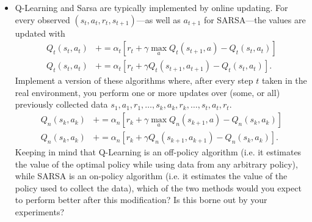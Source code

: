 \documentclass[twoside,a4paper]{article}
\begin{document}
\begin{itemize}
\item Q-Learning and Sarsa are typically implemented by online updating. For every observed $(s_t,a_t, r_t, s_{t+1})$---as well as $a_{t+1}$ for SARSA---the values are updated with
  \begin{align}
    Q_t(s_t, a_t) &+=  \alpha_t [r_t + \gamma \max_a Q_t(s_{t+1}, a) -  Q_t(s_t, a_t)] \tag{Q-Learning}\\
    Q_t(s_t, a_t) &+=  \alpha_t [r_t + \gamma Q_t(s_{t+1}, a_{t+1}) -  Q_t(s_t, a_t)] \tag{SARSA}.
  \end{align}
  Implement a version of these algorithms where, after every step $t$ taken in the real environment, you perform one or more updates over (some, or all) previously collected data $s_1, a_1, r_1, \ldots, s_k, a_k, r_k, \ldots, s_t, a_t, r_t$.
  \begin{align}
    Q_n(s_k, a_k) &+=  \alpha_n [r_k + \gamma \max_a Q_n(s_{k+1}, a) -  Q_n(s_k, a_k)] \tag{Q-Learning}\\
    Q_n(s_k, a_k) &+=  \alpha_n [r_k + \gamma Q_n(s_{k+1}, a_{k+1}) -  Q_n(s_k, a_k)] \tag{SARSA}.
  \end{align}
  Keeping in mind that Q-Learning is an off-policy algorithm (i.e. it estimates the value of the optimal policy while using data from any arbitrary policy), while SARSA is an on-policy algorithm (i.e. it estimates the value of the policy used to collect the data), which of the two methods would you expect to perform better after this modification? Is this borne out by your experiments?
\end{itemize}
\end{document}
